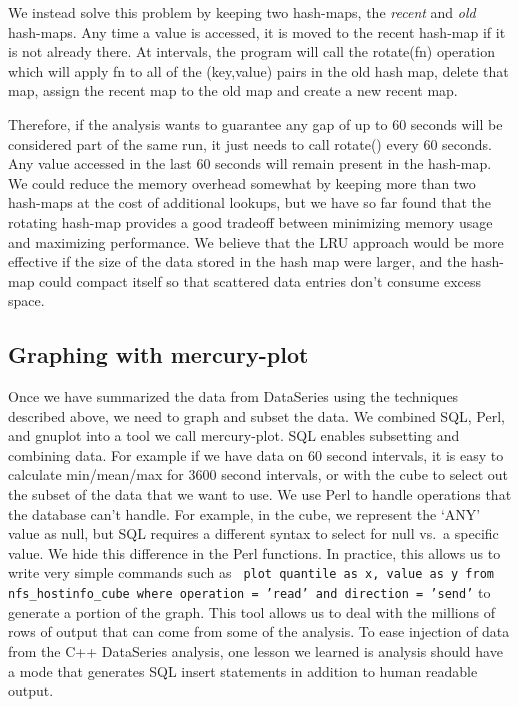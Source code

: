 We instead solve this problem by keeping two hash-maps, the {\it
recent} and {\it old} hash-maps.  Any time a value is accessed, it is
moved to the recent hash-map if it is not already there.  At intervals, 
the program will call the rotate(fn) operation which will apply
fn to all of the (key,value) pairs in the old hash map, delete that map,
assign the recent map to the old map and create a new recent map.

Therefore, if the analysis wants to guarantee any gap of up to 60
seconds will be considered part of the same run, it just needs to call
rotate() every 60 seconds.  Any value accessed in the last 60 seconds
will remain present in the hash-map.  We could reduce the memory
overhead somewhat by keeping more than two hash-maps at the cost of
additional lookups, but we have so far found that the rotating
hash-map provides a good tradeoff between minimizing memory usage and
maximizing performance.  We believe that the LRU approach would be
more effective if the size of the data stored in the hash map were
larger, and the hash-map could compact itself so that scattered
data entries don't consume excess space.

\subsection{Graphing with mercury-plot}

Once we have summarized the data from DataSeries using the techniques
described above, we need to graph and subset the data.  We combined
SQL, Perl, and gnuplot into a tool we call mercury-plot.
 SQL enables subsetting
and combining data. For example if we have data on 60 second
intervals, it is easy to calculate min/mean/max for 3600 second
intervals, or with the cube to select out the subset of the data that
we want to use.  We use Perl to handle operations that the database
can't handle. For example, in the cube, we represent the `ANY' value
as null, but SQL requires a different syntax to select for null vs.\ a
specific value.  We hide this difference in the Perl functions.  In
practice, this allows us to write very simple commands such as {\tt
plot quantile as x, value as y from nfs\_hostinfo\_cube where
operation = 'read' and direction = 'send'} to generate a portion of
the graph.  This tool allows us to deal with the millions of rows of
output that can come from some of the analysis.  To ease injection 
of data from the C++ DataSeries analysis, one lesson we learned is
analysis should have a mode that generates SQL insert statements in
addition to human readable output.
